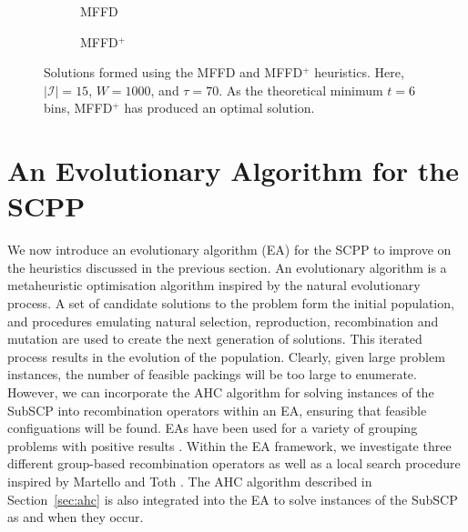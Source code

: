 \documentclass[a4paper,11pt,authoryear]{elsarticle}
\begin{document}
\begin{figure}[H]	
	\centering
	\begin{subfigure}[h]{0.33\textwidth}
		
		\caption{MFFD}
		\label{fig:mffd}
	\end{subfigure} \hspace{15mm}
	\begin{subfigure}[h]{0.33\textwidth}
		
		\caption{MFFD$^+$}
		\label{fig:mffdplus}
	\end{subfigure}
	\caption{Solutions formed using the MFFD and MFFD$^+$ heuristics. Here, $|\mathcal{I}| = 15$, $W = 1000$, and $\tau = 70$. As the theoretical minimum $t = 6$ bins, MFFD$^+$ has produced an optimal solution.}
	\label{fig:mffdvsmffdplus}
\end{figure}

\section{An Evolutionary Algorithm for the SCPP}
\label{sec:ea}
\noindent We now introduce an evolutionary algorithm (EA) for the SCPP to improve on the heuristics discussed in the previous section. An evolutionary algorithm is a metaheuristic optimisation algorithm inspired by the natural evolutionary process. A set of candidate solutions to the problem form the initial population, and procedures emulating natural selection, reproduction, recombination and mutation are used to create the next generation of solutions. This iterated process results in the evolution of the population. Clearly, given large problem instances, the number of feasible packings will be too large to enumerate. However, we can incorporate the AHC algorithm for solving instances of the SubSCP into recombination operators within an EA, ensuring that feasible configuations will be found. EAs have been used for a variety of grouping problems with positive results \cite{lewis2017, falkenauer1996, quiroz2015}. Within the EA framework, we investigate three different group-based recombination operators as well as a local search procedure inspired by Martello and Toth \cite{martello1990l}. The AHC algorithm described in Section~\ref{sec:ahc} is also integrated into the EA to solve instances of the SubSCP as and when they occur.
\end{document}
